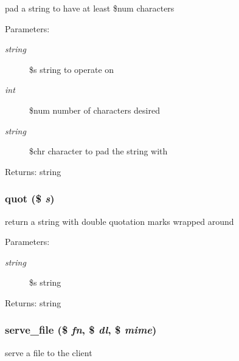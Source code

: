 pad a string to have at least \$num characters

\begin{Desc}
\item[Parameters:]
\begin{description}
\item[{\em string}]\$s string to operate on \item[{\em int}]\$num number of characters desired \item[{\em string}]\$chr character to pad the string with \end{description}
\end{Desc}
\begin{Desc}
\item[Returns:]string \end{Desc}
\hypertarget{util_8inc_8php_3c7d87c658499c1559a6b98cac06f58d}{
\subsubsection[{quot}]{\setlength{\rightskip}{0pt plus 5cm}quot (\$ {\em s})}}
\label{util_8inc_8php_3c7d87c658499c1559a6b98cac06f58d}


return a string with double quotation marks wrapped around

\begin{Desc}
\item[Parameters:]
\begin{description}
\item[{\em string}]\$s string \end{description}
\end{Desc}
\begin{Desc}
\item[Returns:]string \end{Desc}
\hypertarget{util_8inc_8php_9d3ab20fc8b79fb6ab860f93600c745e}{
\subsubsection[{serve\_\-file}]{\setlength{\rightskip}{0pt plus 5cm}serve\_\-file (\$ {\em fn}, \/  \$ {\em dl}, \/  \$ {\em mime})}}
\label{util_8inc_8php_9d3ab20fc8b79fb6ab860f93600c745e}


serve a file to the client

